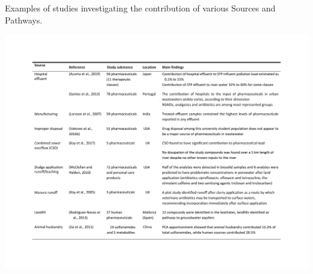\documentclass{article}
\begin{document}
\begin{landscape}
\begin{table}
  \caption{Examples of studies investigating the contribution of various Sources and Pathways.}
  \label{table_sources}
  \includegraphics[page=1,width=22cm ,trim=2cm 2cm 2cm 2cm, clip]{just tables.pdf}
\end{table}
\nocite{Azuma2019EnvironmentalJapan,Santos2013ContributionPharmaceuticals,Larsson2007EffluentPharmaceuticals,Vatovec2017InvestigatingStudents,McClellan2010,Kay2017WidespreadWaters,Kay2005TransportLand,Rodriguez-Navas2013,Jia2011}

  
  


\end{landscape}
\end{document}
